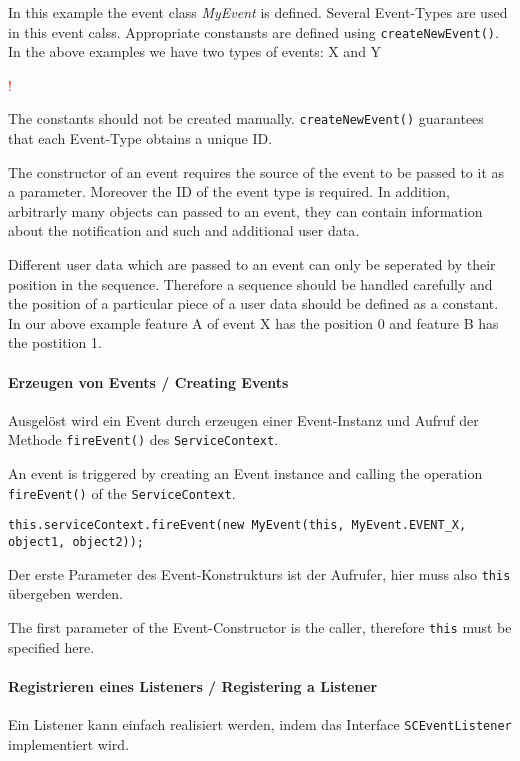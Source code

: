 \documentclass[10pt,a4paper]{scrartcl}
\newcommand{\hinweis}[1]{
\begin{framed}
\begin{minipage}[t]{0.02\textwidth}
\textcolor{red}{\Huge{\sffamily !}}
\end{minipage}
\begin{minipage}[t]{0.94\textwidth}
#1
\end{minipage}
\end{framed}
}
\providecommand{\deng}[2]{#1 / {\sffamily #2}}
\providecommand{\deutsch}[1]{#1}
\providecommand{\englisch}[1]{{\sffamily #1}}
\begin{document}
\englisch{In this example the event class \emph{MyEvent} is defined. Several
Event-Types are used in this event calss. Appropriate constansts are defined
using \texttt{createNewEvent()}. In the above examples we have two types of
events: X and Y

\hinweis{The constants should not be created manually. \texttt{createNewEvent()}
guarantees that each Event-Type obtains a unique ID.}

The constructor of an event requires the source of the event to be passed to it
as a parameter. Moreover the ID of the event type is required. In addition,
arbitrarly many objects can passed to an event, they can contain information 
about the notification and such and additional user data.

Different user data which are passed to an event can only be seperated by their 
position in the sequence. Therefore a sequence should be handled carefully and 
the position of a particular piece of a user data should be defined as a 
constant. In our above example feature A of event X has the position 0 and 
feature B has the postition 1.}


\paragraph{\deng{Erzeugen von Events}{Creating Events}}
\deutsch{Ausgelöst wird ein Event durch erzeugen einer Event-Instanz und Aufruf
der Methode \texttt{fireEvent()} des \texttt{ServiceContext}.}

\englisch{An event is triggered by creating an Event instance and calling the 
operation \texttt{fireEvent()} of the \texttt{ServiceContext}.}

\begin{lstlisting}
this.serviceContext.fireEvent(new MyEvent(this, MyEvent.EVENT_X, object1, object2));
\end{lstlisting}

\deutsch{Der erste Parameter des Event-Konstrukturs ist der Aufrufer, hier muss 
also \texttt{this} übergeben werden.}

\englisch{The first parameter of the Event-Constructor is the caller, therefore
\texttt{this} must be specified here.}


\paragraph{\deng{Registrieren eines Listeners}{Registering a Listener}}
\deutsch{Ein Listener kann einfach realisiert werden, indem das Interface 
\texttt{SCEventListener} implementiert wird.}
\end{document}
